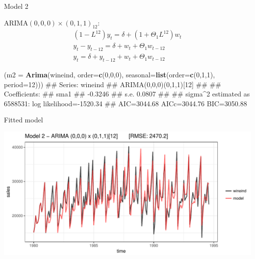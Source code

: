 \documentclass[11pt,ignorenonframetext,]{beamer}
\newenvironment{Shaded}{}{}
\newcommand{\KeywordTok}[1]{\textcolor[rgb]{0.00,0.44,0.13}{\textbf{#1}}}
\newcommand{\DataTypeTok}[1]{\textcolor[rgb]{0.56,0.13,0.00}{#1}}
\newcommand{\DecValTok}[1]{\textcolor[rgb]{0.25,0.63,0.44}{#1}}
\newcommand{\NormalTok}[1]{#1}
\let\oldShaded\Shaded
\let\endoldShaded\endShaded
\renewenvironment{Shaded}{\footnotesize\begin{spacing}{0.9}\oldShaded}{\endoldShaded\end{spacing}}
\begin{document}
\begin{frame}[fragile]{Model 2}

\(\text{ARIMA}(0,0,0) \times (0,1,1)_{12}\): \[
\begin{aligned}
(1-L^{12}) y_t = \delta + (1+\Theta_1 L^{12})  w_t \\
y_t-y_{t-12} = \delta + w_t + \Theta_1 w_{t-12} \\
y_t = \delta + y_{t-12} + w_t + \Theta_1 w_{t-12}
\end{aligned}
\]

\begin{Shaded}
\begin{Highlighting}[]
\NormalTok{(}\DataTypeTok{m2 =} \KeywordTok{Arima}\NormalTok{(wineind, }\DataTypeTok{order=}\KeywordTok{c}\NormalTok{(}\DecValTok{0}\NormalTok{,}\DecValTok{0}\NormalTok{,}\DecValTok{0}\NormalTok{), }\DataTypeTok{seasonal=}\KeywordTok{list}\NormalTok{(}\DataTypeTok{order=}\KeywordTok{c}\NormalTok{(}\DecValTok{0}\NormalTok{,}\DecValTok{1}\NormalTok{,}\DecValTok{1}\NormalTok{), }\DataTypeTok{period=}\DecValTok{12}\NormalTok{)))}
\NormalTok{## Series: wineind }
\NormalTok{## ARIMA(0,0,0)(0,1,1)[12]                    }
\NormalTok{## }
\NormalTok{## Coefficients:}
\NormalTok{##          sma1}
\NormalTok{##       -0.3246}
\NormalTok{## s.e.   0.0807}
\NormalTok{## }
\NormalTok{## sigma^2 estimated as 6588531:  log likelihood=-1520.34}
\NormalTok{## AIC=3044.68   AICc=3044.76   BIC=3050.88}
\end{Highlighting}
\end{Shaded}

\end{frame}

\begin{frame}{Fitted model}

\includegraphics{Lec11_files/figure-beamer/unnamed-chunk-7-1.pdf}

\end{frame}
\end{document}
